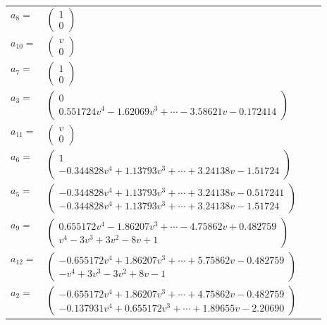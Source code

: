 \documentclass[1p]{elsarticle_modified}
\theoremstyle{definition}
\begin{document}
\begin{tabular}{m{7pt} m{180pt} m{7pt} m{180pt} }
\flushright $a_{8}=$&$\begin{pmatrix}1\\0\end{pmatrix}$ \\
\flushright $a_{10}=$&$\begin{pmatrix}v\\0\end{pmatrix}$ \\
\flushright $a_{7}=$&$\begin{pmatrix}1\\0\end{pmatrix}$ \\
\flushright $a_{3}=$&$\begin{pmatrix}0\\0.551724 v^{4}-1.62069 v^{3}+\cdots-3.58621 v-0.172414\end{pmatrix}$ \\
\flushright $a_{11}=$&$\begin{pmatrix}v\\0\end{pmatrix}$ \\
\flushright $a_{6}=$&$\begin{pmatrix}1\\-0.344828 v^{4}+1.13793 v^{3}+\cdots+3.24138 v-1.51724\end{pmatrix}$ \\
\flushright $a_{5}=$&$\begin{pmatrix}-0.344828 v^{4}+1.13793 v^{3}+\cdots+3.24138 v-0.517241\\-0.344828 v^{4}+1.13793 v^{3}+\cdots+3.24138 v-1.51724\end{pmatrix}$ \\
\flushright $a_{9}=$&$\begin{pmatrix}0.655172 v^{4}-1.86207 v^{3}+\cdots-4.75862 v+0.482759\\v^4-3 v^3+3 v^2-8 v+1\end{pmatrix}$ \\
\flushright $a_{12}=$&$\begin{pmatrix}-0.655172 v^{4}+1.86207 v^{3}+\cdots+5.75862 v-0.482759\\- v^4+3 v^3-3 v^2+8 v-1\end{pmatrix}$ \\
\flushright $a_{2}=$&$\begin{pmatrix}-0.655172 v^{4}+1.86207 v^{3}+\cdots+4.75862 v-0.482759\\-0.137931 v^{4}+0.655172 v^{3}+\cdots+1.89655 v-2.20690\end{pmatrix}$ \\

\end{tabular}
\end{document}
